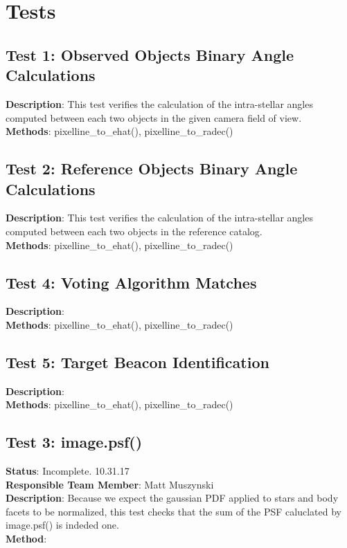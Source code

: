 \documentclass[]{DINOReportMemo}
\begin{document}
\newpage
\section{Tests}

\subsection{Test 1: Observed Objects Binary Angle Calculations}
\textbf{Description}: This test verifies the calculation of the intra-stellar angles computed between each two objects in the given camera field of view.\\
\textbf{Methods}: pixelline\_to\_ehat(), pixelline\_to\_radec()\\

\subsection{Test 2: Reference Objects Binary Angle Calculations}
\textbf{Description}: This test verifies the calculation of the intra-stellar angles computed between each two objects in the reference catalog.\\
\textbf{Methods}: pixelline\_to\_ehat(), pixelline\_to\_radec()\\

\subsection{Test 4: Voting Algorithm Matches}
\textbf{Description}: \\
\textbf{Methods}: pixelline\_to\_ehat(), pixelline\_to\_radec()\\

\subsection{Test 5: Target Beacon Identification}
\textbf{Description}: \\
\textbf{Methods}: pixelline\_to\_ehat(), pixelline\_to\_radec()\\

\newpage

\subsection{Test 3: image.psf()}
\textbf{Status}: Incomplete. 10.31.17\\
\textbf{Responsible Team Member}: Matt Muszynski \\
\textbf{Description}: Because we expect the gaussian PDF applied to stars and body facets to be normalized, this test checks that the sum of the PSF caluclated by image.psf() is indeded one.\\
\textbf{Method}: \\
\end{document}

